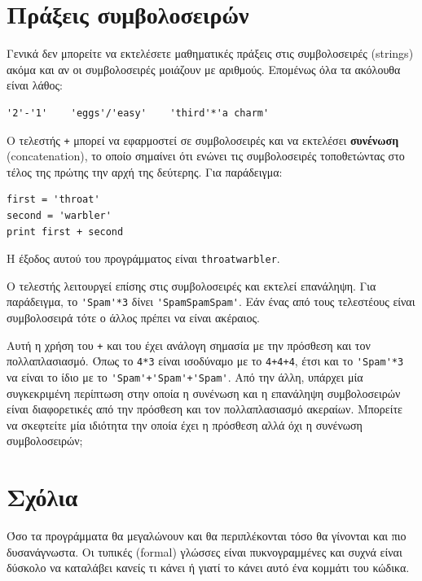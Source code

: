 \documentclass[10pt]{book}
\begin{document}
\section{Πράξεις συμβολοσειρών}

Γενικά δεν μπορείτε να εκτελέσετε μαθηματικές πράξεις στις συμβολοσειρές (strings) ακόμα και αν οι συμβολοσειρές μοιάζουν με αριθμούς. Επομένως όλα τα ακόλουθα είναι λάθος:

\begin{verbatim}
'2'-'1'    'eggs'/'easy'    'third'*'a charm'
\end{verbatim}
%

Ο τελεστής {\tt +} μπορεί να εφαρμοστεί σε συμβολοσειρές και να εκτελέσει 
{\bf συνένωση} (concatenation), το οποίο σημαίνει ότι ενώνει τις συμβολοσειρές
τοποθετώντας στο τέλος της πρώτης την αρχή της δεύτερης. Για παράδειγμα: 

\begin{verbatim}
first = 'throat'
second = 'warbler'
print first + second
\end{verbatim}
%

Η έξοδος αυτού του προγράμματος είναι  {\tt throatwarbler}.

Ο τελεστής {\tt *} λειτουργεί επίσης στις συμβολοσειρές και εκτελεί
επανάληψη.  Για παράδειγμα, το \verb"'Spam'*3" δίνει \verb"'SpamSpamSpam'". 
Εάν ένας από τους τελεστέους είναι συμβολοσειρά τότε ο άλλος πρέπει να είναι ακέραιος.

Αυτή η χρήση του {\tt +} και του {\tt *} έχει ανάλογη
σημασία με την πρόσθεση και τον πολλαπλασιασμό.  Όπως το {\tt 4*3} 
είναι ισοδύναμο με το {\tt 4+4+4}, έτσι και το \verb"'Spam'*3"  να είναι το ίδιο με το  \verb"'Spam'+'Spam'+'Spam'".  Από την άλλη, υπάρχει μία συγκεκριμένη περίπτωση στην οποία η συνένωση και η επανάληψη συμβολοσειρών είναι διαφορετικές από την πρόσθεση και τον πολλαπλασιασμό ακεραίων.  Μπορείτε να σκεφτείτε μία ιδιότητα την οποία έχει η πρόσθεση αλλά όχι η συνένωση συμβολοσειρών;


\section{Σχόλια}

Όσο τα προγράμματα θα μεγαλώνουν και θα περιπλέκονται τόσο θα γίνονται 
και πιο δυσανάγνωστα. Οι τυπικές (formal) γλώσσες είναι πυκνογραμμένες 
και συχνά είναι δύσκολο να καταλάβει κανείς τι κάνει ή γιατί το κάνει αυτό ένα κομμάτι του κώδικα.
\end{document}
